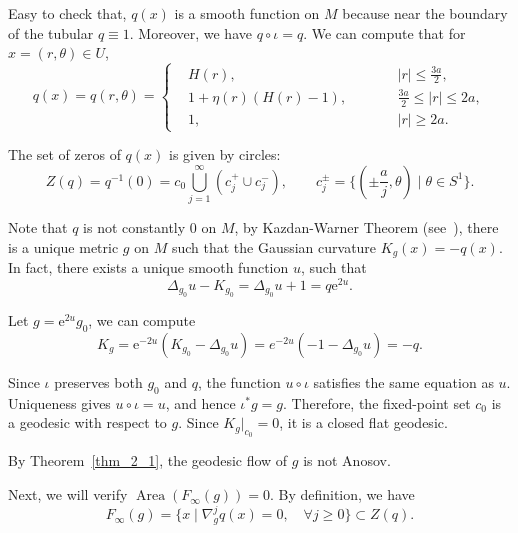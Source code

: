 \documentclass[reqno,11pt]{article}
\theoremstyle{definition}
\theoremstyle{remark}
\numberwithin{equation}{section}
\DeclareMathOperator{\area}{Area}
\begin{document}
Easy to check that, $q(x)$ is a smooth function on $M$ because near the boundary of the tubular $q\equiv1$. Moreover, we have $q\circ\iota=q$. We can compute that for $x=(r,\theta)\in U$,
\begin{displaymath}
	q(x)=q(r,\theta)=\left\{
	\begin{aligned}
		 & H(r),\qquad              &  & |r|\leq\frac{3a}{2},         \\
		 & 1+\eta(r)(H(r)-1),\qquad &  & \frac{3a}{2}\leq |r|\leq 2a, \\
		 & 1,\qquad                 &  & |r|\geq 2a.
	\end{aligned}
	\right.
\end{displaymath}

The set of zeros of $q(x)$ is given by circles:
\begin{displaymath}
	Z(q)=q^{-1}(0)=c_{0}\bigcup_{j=1}^{\infty}(c_{j}^{+}\cup c_{j}^{-}),\qquad c_{j}^{\pm}=\{(\pm\frac{a}{j},\theta)\mid \theta\in S^{1}\}.
\end{displaymath}

Note that $q$ is not constantly $0$ on $M$, by Kazdan-Warner Theorem (see~\cite{KazdanWarner1974}), there is a unique metric $g$ on $M$ such that the Gaussian curvature $K_{g}(x)=-q(x)$. In fact, there exists a unique smooth function $u$, such that
\begin{equation}
	\Delta_{g_0}u-K_{g_{0}}=\Delta_{g_0}u+1=q\mathrm{e}^{2u}.
\end{equation}

Let $g=\mathrm{e}^{2u}g_{0}$, we can compute
\begin{displaymath}
	K_{g}=\mathrm{e}^{-2u}(K_{g_{0}}-\Delta_{g_{0}}u)=e^{-2u}(-1-\Delta_{g_{0}}u)=-q.
\end{displaymath}

Since $\iota$ preserves both $g_{0}$ and $q$, the function $u\circ\iota$ satisfies the same equation as $u$. Uniqueness gives $u\circ\iota=u$, and hence $\iota^{\ast}g=g$. Therefore, the fixed-point set $c_0$ is a geodesic with respect to $g$. Since $K_{g}|_{c_0}=0$, it is a closed flat geodesic.

By Theorem~\ref{thm_2_1}, the geodesic flow of $g$ is not Anosov.

Next, we will verify $\area(F_{\infty}(g))=0$. By definition, we have
\begin{displaymath}
	F_{\infty}(g)=\{x\mid \nabla_{g}^{j}q(x)=0,\quad\forall j\ge 0\}\subset Z(q).
\end{displaymath}
\end{document}
